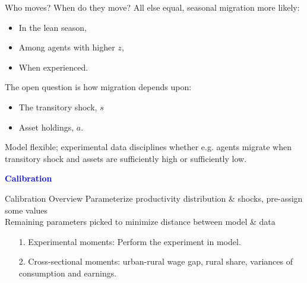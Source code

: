 \documentclass[9pt,pdftex,aspectratio=1610]{beamer}
\theoremstyle{definition}
\begin{document}
\begin{frame}[t]{Who moves? When do they move?}
All else equal, seasonal migration more likely:
\begin{itemize}
\smallskip
\item In the lean season,
\smallskip
\item Among agents with higher $z$,
\smallskip
\item When experienced.
\end{itemize}
\bigskip
The open question is how migration depends upon:
\begin{itemize}
\smallskip
\item The transitory shock, $s$
\smallskip
\item Asset holdings, $a$.
\end{itemize}
\bigskip
Model flexible; experimental data disciplines whether e.g. agents migrate when transitory shock and assets are sufficiently high or sufficiently low.
\end{frame}


\begin{frame}
\vspace{1cm}
\begin{center}
\textbf{\textcolor{blue}{\large Calibration}}
\end{center}
\end{frame}


\begin{frame}[t]{Calibration Overview}
Parameterize productivity distribution \& shocks, pre-assign some values \\
\bigskip
Remaining parameters picked to minimize distance between model \& data
\begin{itemize}
\smallskip
\item[1.] Experimental moments: Perform the \citet{brch14} experiment in model.
\smallskip
\item[2.] Cross-sectional moments: urban-rural wage gap, rural share, variances of consumption and earnings.
\end{itemize}
\bigskip
\end{frame}
\end{document}
